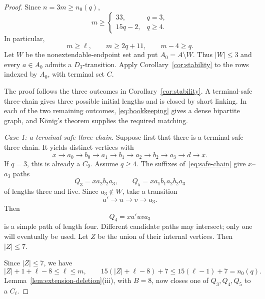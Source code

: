 \documentclass[11pt]{amsart}
\theoremstyle{definition}
\begin{document}
\begin{proof}
Since $n=3m\ge n_0(q)$,
\[
  m\ge
  \begin{cases}
    33,&q=3,\\
    15q-2,&q\ge4.
  \end{cases}
\]
In particular,
\begin{equation}\label{eq:first-port-numerics}
  m\ge\ell,\qquad m\ge2q+11,\qquad m-4\ge q.
\end{equation}
Let $W$ be the nonextendable-endpoint set and put $A_0=A\setminus W$.
Thus $|W|\le3$ and every $a\in A_0$ admits a $D_3$-transition.  Apply
Corollary~\ref{cor:stability} to the rows indexed by $A_0$, with terminal
set $C$.

The proof follows the three outcomes in Corollary~\ref{cor:stability}.
A terminal-safe three-chain gives three possible initial lengths and is
closed by short linking.  In each of the two remaining outcomes,
\eqref{eq:bookkeeping} gives a dense bipartite graph, and K\"onig's
theorem supplies the required matching.

\smallskip
\noindent\emph{Case 1: a terminal-safe three-chain.}
Suppose first that there is a terminal-safe three-chain.  It yields distinct vertices with
\begin{equation}\label{eq:safe-chain}
  x\to a_0\to b_0\to a_1\to b_1\to a_2\to b_2\to a_3\to d\to x.
\end{equation}
If $q=3$, this is already a $C_9$.  Assume $q\ge4$.  The suffixes of~\eqref{eq:safe-chain} give $x$--$a_3$ paths
\[
  Q_3=xa_2b_2a_3,\qquad
  Q_5=xa_1b_1a_2b_2a_3
\]
of lengths three and five.  Since $a_3\notin W$, take a transition
\[
  a'\to u\to v\to a_3.
\]
Then
\[
  Q_4=xa'uva_3
\]
is a simple path of length four.  Different candidate paths may intersect; only one will eventually be used.  Let $Z$ be the union of their internal vertices.  Then $|Z|\le7$.

Since $|Z|\le7$, we have
\[
  |Z|+1+\ell-8\le\ell\le m,
  \qquad
  15(|Z|+\ell-8)+7\le15(\ell-1)+7=n_0(q).
\]
Lemma~\ref{lem:extension-deletion}(iii), with $B=8$, now closes one of
$Q_3,Q_4,Q_5$ to a $C_\ell$.


\end{proof}
\end{document}
